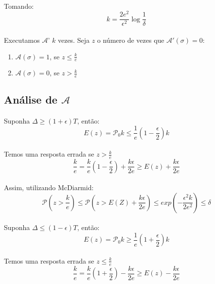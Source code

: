 \paragraph{} Tomando:
$$k = \frac{2e^2}{\epsilon^2}\log{\frac{1}{\delta}}$$
\paragraph{} Executamos $\mathcal{A}$' $k$ vezes. Seja $z$ o número de vezes que $\mathcal{A}'(\sigma)=0$:
\begin{enumerate}
    \centering
    \item $\mathcal{A}(\sigma) = 1$, se $z \leq \frac{k}{e}$
    \item $\mathcal{A}(\sigma) = 0$, se $z > \frac{k}{e}$
\end{enumerate}
\subsection{Análise de $\mathcal{A}$}
\paragraph{} Suponha $\Delta \geq (1+\epsilon)T$, então:
$$E(z) = \mathcal{P}_0 k \leq \frac{1}{e}(1-\frac{\epsilon}{2})k$$
\paragraph{} Temos uma resposta errada se $z > \frac{k}{e}$
$$\frac{k}{e} = \frac{k}{e}(1-\frac{\epsilon}{2}) + \frac{k\epsilon}{2e} \geq E(z) + \frac{k\epsilon}{2e}$$
\paragraph{} Assim, utilizando McDiarmid:
$$\mathcal{P}(z>\frac{k}{e}) \leq \mathcal{P}(z > E(Z)+\frac{k\epsilon}{2e}) \leq exp(-\frac{\epsilon^2k}{2e^2})\leq \delta$$

\paragraph{} Suponha $\Delta \leq (1-\epsilon)T$, então:
$$E(z) = \mathcal{P}_0 k \geq \frac{1}{e}(1+\frac{\epsilon}{2})k$$
\paragraph{} Temos uma resposta errada se $z \leq \frac{k}{e}$
$$\frac{k}{e} = \frac{k}{e}(1+\frac{\epsilon}{2}) - \frac{k\epsilon}{2e} \geq E(z) - \frac{k\epsilon}{2e}$$
